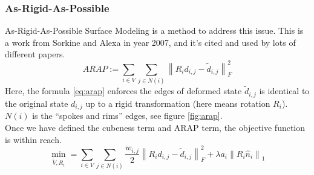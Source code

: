 \documentclass[a4paper,10pt]{article}
\begin{document}
\subsubsection{As-Rigid-As-Possible}\label{arap}
As-Rigid-As-Possible Surface Modeling \cite{arap} is a method to address this issue. This is a work from Sorkine and Alexa in year 2007, and it's cited and used by lots of different papers. 
	\begin{equation}
		ARAP:=\sum_{i\in V}\sum_{j\in N(i)} \left\lVert R_i d_{i,j} - \tilde{d}_{i,j} \right\rVert _F^2
		\label{eq:arap}
	\end{equation}
Here, the formula \ref{eq:arap} enforces the edges of deformed state $\tilde{d}_{i,j}$ is identical to the original state $d_{i,j}$ up to a rigid transformation (here means rotation $R_i$). $N(i)$ is the “spokes and rims” edges, see figure \ref{fig:arap}.\\

Once we have defined the cubeness term and ARAP term, the objective function is within reach. 
\begin{equation}
	\underset{\tilde{V},R_i}{\min} = \sum_{i\in V}\sum_{j\in N(i)} \frac{w_{i,j}}{2}\left\lVert R_i d_{i,j} - \tilde{d}_{i,j} \right\rVert _F^2 +  \lambda a_i\left\lVert R_i \hat{n}_i\right\rVert _1
	\label{eq:obj}
\end{equation}
\end{document}
